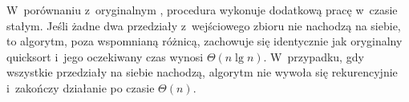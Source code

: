 \subproblem %
W~porównaniu z~oryginalnym , procedura  wykonuje dodatkową pracę w~czasie stałym.
Jeśli żadne dwa przedziały z~wejściowego zbioru nie nachodzą na siebie, to algorytm, poza wspomnianą różnicą, zachowuje się identycznie jak oryginalny quicksort i~jego oczekiwany czas wynosi $\Theta(n\lg n)$.
W~przypadku, gdy wszystkie przedziały na siebie nachodzą, algorytm nie wywoła się rekurencyjnie i~zakończy działanie po czasie $\Theta(n)$.
